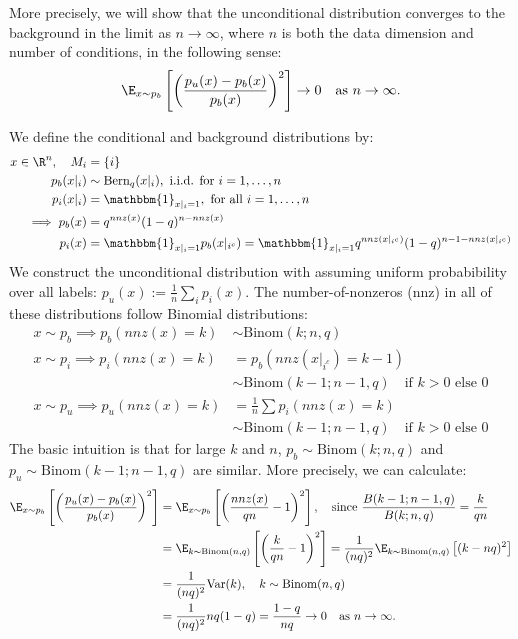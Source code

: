 More precisely, we will show that the unconditional distribution converges to the background in the limit as $n \to \infty$, where $n$ is both the data dimension and number of conditions, in the following sense:
$$ \E_{x \sim p_b} \left[ \left( \frac{p_u(x) - p_b(x)}{p_b(x)} \right)^2 \right] \to 0 \quad \text{as } n \to \infty.$$

We define the conditional and background distributions by:
\begin{align*}
    x \in \R^n, \quad M_i &= \{i\} \\ 
    p_b(x|_{i}) &\sim \text{Bern}_q(x|_{i}), \text{ i.i.d. for $i=1,\ldots, n$} \\
    p_i(x|_{i}) &= \mathbbm{1}_{x|_{i} = 1}, \text{ for all $i=1,\ldots, n$} \\
    \implies p_b(x) &= q^{nnz(x)} (1-q)^{n - nnz(x)}\\ 
    p_i(x) &= \mathbbm{1}_{x|_{i} = 1} p_b(x|_{i^c}) 
    = \mathbbm{1}_{x|_{i} = 1}  
    q^{nnz(x|_{i^c})} (1-q)^{n - 1 - nnz(x|_{i^c})}
\end{align*}
We construct the unconditional distribution with assuming uniform probabibility over all labels: $p_u(x) := \frac{1}{n} \sum_i p_i(x)$.
The number-of-nonzeros (nnz) in all of these distributions follow Binomial distributions:
\begin{align*}
    x \sim p_b \implies p_b(nnz(x) = k) &\sim \text{Binom}(k; n, q) \\
    x \sim p_i \implies p_i(nnz(x) = k) &= p_b(nnz(x|_{i^c}) = k-1) \\
    &\sim \text{Binom}(k-1; n-1, q) \quad \text{if } k > 0 \text{ else } 0 \\
    x \sim p_u \implies p_u(nnz(x) = k) &= \frac{1}{n} \sum p_i(nnz(x) = k) \\
    &\sim \text{Binom}(k-1; n-1, q) \quad \text{if } k > 0 \text{ else } 0
\end{align*}
The basic intuition is that for large $k$ and $n$, $p_b \sim \text{Binom}(k; n, q)$ and $p_u \sim \text{Binom}(k-1; n-1, q)$ are similar. More precisely, we can calculate:
\begin{align*}
    \E_{x \sim p_b} \left[ \left( \frac{p_u(x) - p_b(x)}{p_b(x)} \right)^2 \right] &=
    \E_{x \sim p_b} \left[ \left(\frac{nnz(x)}{qn} - 1\right)^2 \right], \quad \text{since } \frac{B(k-1; n-1, q)}{B(k; n, q)} = \frac{k}{qn} \\
    &= \E_{k \sim \text{Binom}(n, q)} \left[ \left(\frac{k}{qn} - 1\right)^2 \right] 
    = \frac{1}{(nq)^2} \E_{k \sim \text{Binom}(n, q)} \left[ (k - nq)^2 \right] \\
    &= \frac{1}{(nq)^2} \text{Var}(k), \quad k \sim \text{Binom}(n, q) \\
    &= \frac{1}{(nq)^2} n q (1-q) 
    = \frac{1-q}{nq} \to 0 \quad \text{as } n \to \infty.
\end{align*}

